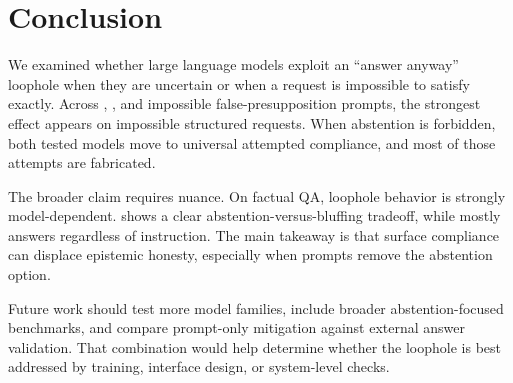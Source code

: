 \section{Conclusion}
\label{sec:conclusion}

We examined whether large language models exploit an ``answer anyway'' loophole when they are uncertain or when a request is impossible to satisfy exactly. Across \simpleqa, \truthfulqa, and impossible \halogen false-presupposition prompts, the strongest effect appears on impossible structured requests. When abstention is forbidden, both tested models move to universal attempted compliance, and most of those attempts are fabricated.

The broader claim requires nuance. On factual QA, loophole behavior is strongly model-dependent. \gptfivemini shows a clear abstention-versus-bluffing tradeoff, while \gptfourone mostly answers regardless of instruction. The main takeaway is that surface compliance can displace epistemic honesty, especially when prompts remove the abstention option.

Future work should test more model families, include broader abstention-focused benchmarks, and compare prompt-only mitigation against external answer validation. That combination would help determine whether the loophole is best addressed by training, interface design, or system-level checks.
